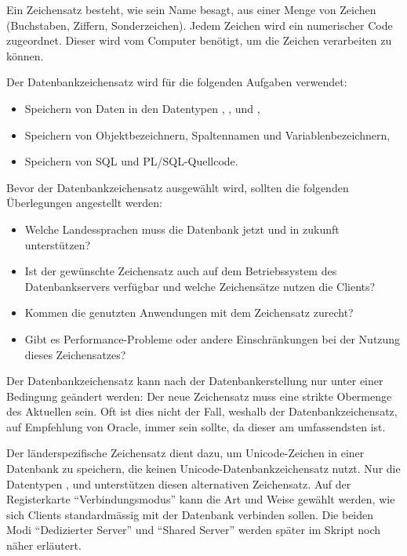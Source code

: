           \begin{merke}
            Ein Zeichensatz besteht, wie sein Name besagt, aus einer Menge von Zeichen (Buchstaben,               Ziffern, Sonderzeichen). Jedem Zeichen wird ein numerischer Code zugeordnet. Dieser wird vom Computer benötigt, um die Zeichen verarbeiten zu können.
          \end{merke}
          Der Datenbankzeichensatz wird für die folgenden Aufgaben verwendet:
          \begin{itemize}
            \item Speichern von Daten in den Datentypen , ,  und ,
            \item Speichern von Objektbezeichnern, Spaltennamen und Variablen\-be\-zeich\-nern,
            \item Speichern von SQL und PL/SQL-Quellcode.
          \end{itemize}
          Bevor der Datenbankzeichensatz ausgewählt wird, sollten die folgenden Überlegungen angestellt werden:
          \begin{itemize}
            \item Welche Landessprachen muss die Datenbank jetzt und in zukunft unterstützen?
            \item Ist der gewünschte Zeichensatz auch auf dem Betriebssystem des Datenbankservers verfügbar und welche Zeichensätze nutzen die Clients?
            \item Kommen die genutzten Anwendungen mit dem Zeichensatz zurecht?
            \item Gibt es Performance-Probleme oder andere Einschränkungen bei der Nutzung dieses Zeichensatzes?
          \end{itemize}

          \begin{merke}
            Der Datenbankzeichensatz kann nach der Datenbankerstellung nur unter einer Bedingung geändert werden: Der neue Zeichensatz muss eine strikte Obermenge des Aktuellen sein. Oft ist dies nicht der Fall, weshalb der Datenbankzeichensatz, auf Empfehlung von Oracle, immer  sein sollte, da dieser am umfassendsten ist.
          \end{merke}
          Der länderspezifische Zeichensatz dient dazu, um Unicode-Zeichen in einer Datenbank zu speichern, die keinen Unicode-Datenbankzeichensatz nutzt. Nur die Datentypen ,  und  unterstützen diesen alternativen Zeichensatz.
          Auf der Registerkarte \enquote{Verbindungsmodus} kann die Art und Weise gewählt werden, wie sich Clients standardmässig mit der Datenbank verbinden sollen. Die beiden Modi \enquote{Dedizierter Server} und \enquote{Shared Server} werden später im Skript noch näher erläutert.
